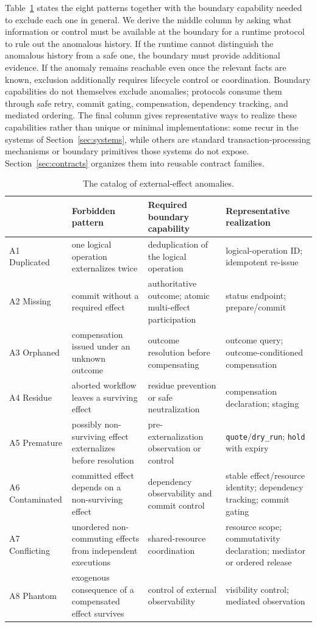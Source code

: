 \documentclass{article}
\begin{document}
Table~\ref{tab:catalog} states the eight patterns together with the boundary
capability needed to exclude each one in general. We derive the middle
column by asking what information or control must be available at the
boundary for a runtime protocol to rule out the anomalous history. If the
runtime cannot distinguish the anomalous history from a safe one, the
boundary must provide additional evidence. If the anomaly remains reachable
even once the relevant facts are known, exclusion additionally requires
lifecycle control or coordination. Boundary capabilities do not themselves
exclude anomalies; protocols consume them through safe retry, commit gating,
compensation, dependency tracking, and mediated ordering. The final column
gives representative ways to realize these capabilities rather than unique
or minimal implementations: some recur in the systems of
Section~\ref{sec:systems}, while others are standard transaction-processing
mechanisms or boundary primitives those systems do not expose.
Section~\ref{sec:contracts} organizes them into reusable contract families.

\begin{table}[t]
\centering
\renewcommand{\arraystretch}{1.15}
\small
\caption{The catalog of external-effect anomalies.}
\label{tab:catalog}
\begin{tabularx}{\linewidth}{@{}l X X X@{}}
\toprule
\textbf{} & \textbf{Forbidden pattern} & \textbf{Required boundary capability} & \textbf{Representative realization} \\
\midrule
A1 Duplicated & one logical operation externalizes twice & deduplication of the logical operation & logical-operation ID; idempotent re-issue \\
A2 Missing & commit without a required effect & authoritative outcome; atomic multi-effect participation & status endpoint; prepare/commit \\
A3 Orphaned & compensation issued under an unknown outcome & outcome resolution before compensating & outcome query; outcome-conditioned compensation \\
A4 Residue & aborted workflow leaves a surviving effect & residue prevention or safe neutralization & compensation declaration; staging \\
A5 Premature & possibly non-surviving effect externalizes before resolution & pre-externalization observation or control & \texttt{quote}/\texttt{dry\_run}; \texttt{hold} with expiry \\
A6 Contaminated & committed effect depends on a non-surviving effect & dependency observability and commit control & stable effect/resource identity; dependency tracking; commit gating \\
A7 Conflicting & unordered non-commuting effects from independent executions & shared-resource coordination & resource scope; commutativity declaration; mediator or ordered release \\
A8 Phantom & exogenous consequence of a compensated effect survives & control of external observability & visibility control; mediated observation \\
\bottomrule
\end{tabularx}
\end{table}
\end{document}
